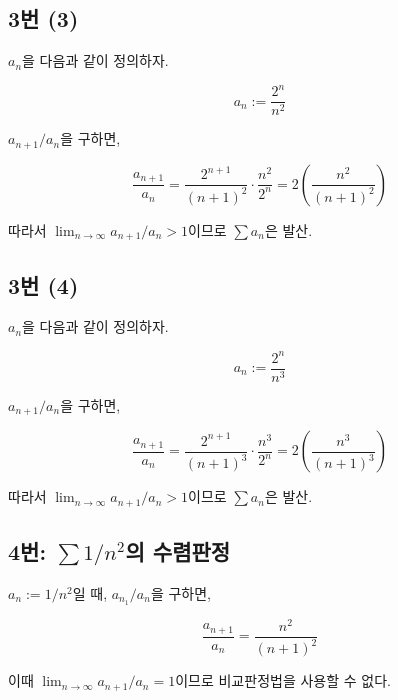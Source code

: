 \subsection{3번 (3)}
$a_n$을 다음과 같이 정의하자.

\[
a_n:=\frac{2^n}{n^2}
\]

$a_{n+1}/a_n$을 구하면,

\[
\frac{a_{n+1}}{a_n}=\frac{2^{n+1}}{(n+1)^2}\cdot\frac{n^2}{2^n}=2(\frac{n^2}{(n+1)^2})
\]

따라서 $\lim_{n\to\infty}a_{n+1}/a_n>1$이므로 $\sum a_n$은 발산.

\subsection{3번 (4)}
$a_n$을 다음과 같이 정의하자.

\[
a_n:=\frac{2^n}{n^3}
\]

$a_{n+1}/a_n$을 구하면,

\[
\frac{a_{n+1}}{a_n}=\frac{2^{n+1}}{(n+1)^3}\cdot\frac{n^3}{2^n}=2(\frac{n^3}{(n+1)^3})
\]

따라서 $\lim_{n\to\infty}a_{n+1}/a_n>1$이므로 $\sum a_n$은 발산.

\subsection{4번: $\sum1/n^2$의 수렴판정}
$a_n:=1/n^2$일 때, $a_{n_1}/a_n$을 구하면,

\[
\frac{a_{n+1}}{a_n}=\frac{n^2}{(n+1)^2}
\]

이때 $\lim_{n\to\infty}a_{n+1}/a_n=1$이므로 비교판정법을 사용할 수 없다.

